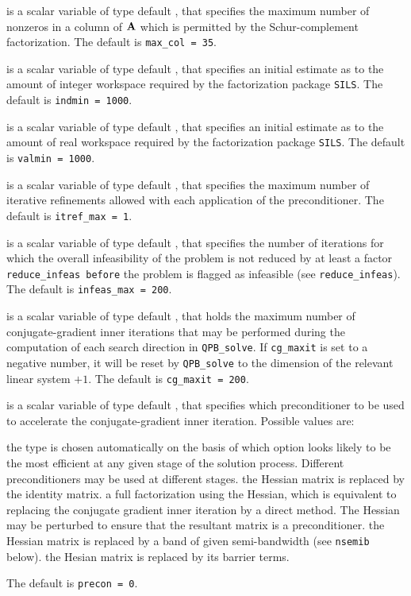 \begin{description}
 is a scalar variable of type default \integer, that specifies
the maximum number of nonzeros in a column of ${\mathbf{A}}$ which is permitted
by the Schur-complement factorization.
The default is {\tt max\_col = 35}.

 is a scalar variable of type default \integer, that specifies
an initial estimate as to the amount of integer workspace required by 
the factorization package {\tt SILS}.
The default is {\tt indmin = 1000}.

 is a scalar variable of type default \integer, that specifies
an initial estimate as to the amount of real workspace required by 
the factorization package {\tt SILS}.
The default is {\tt valmin = 1000}.

 is a scalar variable of type default \integer, that specifies 
the maximum number of iterative refinements allowed with each application 
of the preconditioner.
The default is {\tt itref\_max = 1}.

 is a scalar variable of type default \integer, that specifies
the number of iterations for which the overall infeasibility
of the problem is not reduced by at least a factor {\tt reduce\_infeas
before} the problem is flagged as infeasible (see {\tt reduce\_infeas}).
The default is {\tt infeas\_max = 200}.

 is a scalar variable of type default \integer, that holds the
maximum number of conjugate-gradient inner iterations that may be performed
during the computation of each search direction in {\tt QPB\_solve}.
If {\tt cg\_maxit} is set to a negative number, it will be reset by 
{\tt QPB\_solve} to the dimension of the relevant linear system $+ 1$.
The default is {\tt cg\_maxit = 200}.

 is a scalar variable of type default \integer, that specifies
which preconditioner to be used to accelerate the conjugate-gradient 
inner iteration.  Possible values are:

\begin{description}
 the type is chosen automatically on the basis of which option looks
        likely to be the most efficient at any given stage of the solution
        process. Different preconditioners may be used at different stages.
 the Hessian matrix is replaced by the identity matrix.
 a full factorization using the Hessian, which is equivalent to
        replacing the conjugate gradient inner iteration by a direct method.
        The Hessian may be perturbed to ensure that the resultant matrix
        is a preconditioner.
 the Hessian matrix is replaced by a band of given semi-bandwidth
        (see {\tt nsemib} below).
 the Hesian matrix is replaced by its barrier terms.
\end{description}
The default is {\tt precon = 0}.


\end{description}
